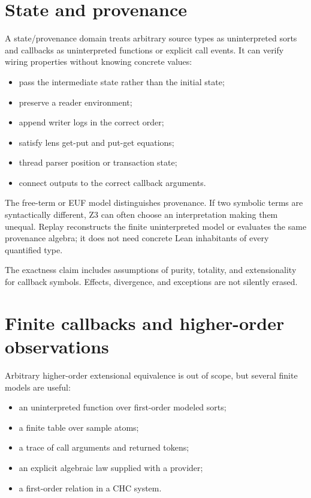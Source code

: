 \documentclass[10pt,letterpaper,oneside]{report}
\begin{document}
\section{State and provenance}

A state/provenance domain treats arbitrary source types as uninterpreted sorts and callbacks as uninterpreted functions or explicit call events. It can verify wiring properties without knowing concrete values:

\begin{itemize}
\item pass the intermediate state rather than the initial state;
\item preserve a reader environment;
\item append writer logs in the correct order;
\item satisfy lens get-put and put-get equations;
\item thread parser position or transaction state;
\item connect outputs to the correct callback arguments.
\end{itemize}

The free-term or EUF model distinguishes provenance. If two symbolic terms are syntactically different, Z3 can often choose an interpretation making them unequal. Replay reconstructs the finite uninterpreted model or evaluates the same provenance algebra; it does not need concrete Lean inhabitants of every quantified type.

The exactness claim includes assumptions of purity, totality, and extensionality for callback symbols. Effects, divergence, and exceptions are not silently erased.

\section{Finite callbacks and higher-order observations}

Arbitrary higher-order extensional equivalence is out of scope, but several finite models are useful:

\begin{itemize}
\item an uninterpreted function over first-order modeled sorts;
\item a finite table over sample atoms;
\item a trace of call arguments and returned tokens;
\item an explicit algebraic law supplied with a provider;
\item a first-order relation in a CHC system.
\end{itemize}
\end{document}
